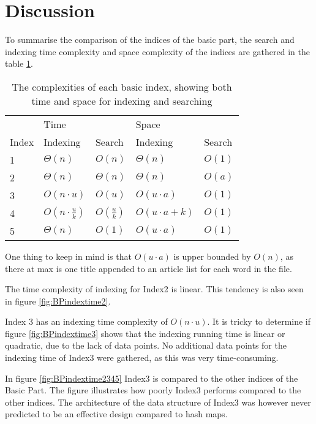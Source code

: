 \section{Discussion}

To summarise the comparison of the indices of the basic part, the search and indexing time complexity and space complexity of the indices are gathered in the table \ref{tab:basicpartTimecomplexity}. 

\begin{table}[th!]
\centering
\begin{tabular}{l|ll|ll}
            & Time &     & Space & \\
    Index & Indexing & Search & Indexing & Search\\
\hline
1 &  $\Theta(n)$                &  $O(n)$  &  $\Theta(n)$   & $O(1)$ \\
2 &  $\Theta(n)$                &  $\Theta(n)$  &  $\Theta(n)$   & $O(a)$         \\
3  &  $O(n\cdot u)$             &  $O(u)$  &  $O(u\cdot a )$ & $O(1)$         \\
4  &  $O(n\cdot \frac{u}{k})$   &  $O(\frac{u}{k})$  &  $O(u\cdot a + k)$ & $O(1)$ \\
5  &  $\Theta(n)$   &  $O(1)$  &  $O(u\cdot a)$ & $O(1)$         
\end{tabular}
\caption{The complexities of each basic index, showing both time and space for indexing and searching}
\label{tab:basicpartTimecomplexity}
\end{table}

One thing to keep in mind is that $O(u\cdot a)$ is upper bounded by $O(n)$, as there at max is one title appended to an article list for each word in the file.

The time complexity of indexing for Index2 is linear. This tendency is also seen in figure \ref{fig:BPindextime2}.

Index 3 has an indexing time complexity of $O(n\cdot u)$. It is tricky to determine if figure \ref{fig:BPindextime3} shows that the indexing running time is linear or quadratic, due to the lack of data points. No additional data points for the indexing time of Index3 were gathered, as this was very time-consuming. 

In figure \ref{fig:BPindextime2345} Index3 is compared to the other indices of the Basic Part. The figure illustrates how poorly Index3 performs compared to the other indices. The architecture of the data structure of Index3 was however never predicted to be an effective design compared to hash maps. 

